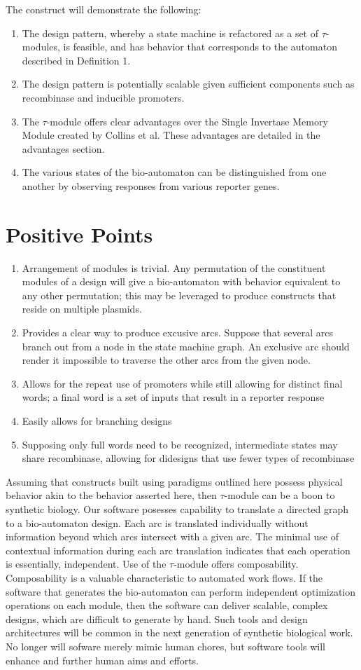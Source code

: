 \documentclass{article}
\begin{document}
\newpage%
The construct will demonstrate the following:
\begin{enumerate}
\item The design pattern, whereby a state machine is refactored as a set of $\tau$-modules, is feasible, and has behavior that corresponds to the automaton described in Definition 1.
\item The design pattern is potentially scalable given sufficient components such as recombinase and inducible promoters.
\item The $\tau$-module offers clear advantages over the Single Invertase Memory Module created by Collins et al.  These advantages are detailed in the advantages section.
\item The various states of the bio-automaton can be distinguished from one another by observing responses from various reporter genes.
\end{enumerate}
\section{Positive Points}
\begin{enumerate}
\item Arrangement of modules is trivial.  Any permutation of the constituent modules of a design will give a bio-automaton with behavior equivalent to any other permutation; this may be leveraged to produce constructs that reside on multiple plasmids.
\item Provides a clear way to produce excusive arcs.  Suppose that several arcs branch out from a node in the state machine graph.  An exclusive arc should render it impossible to traverse the other arcs from the given node. 
\item Allows for the repeat use of promoters while still allowing for distinct final words; a final word is a set of inputs that result in a reporter response
\item Easily allows for branching designs
\item Supposing only full words need to be recognized, intermediate states may share recombinase, allowing for didesigns that use fewer types of recombinase 
\end{enumerate}

Assuming that constructs built using paradigms outlined here possess physical behavior akin to the behavior asserted here, then $\tau$-module can be a boon to synthetic biology. Our software posesses capability to translate a directed graph to a bio-automaton design.  Each arc is translated individually without information beyond which arcs intersect with a given arc. The minimal use of contextual information during each arc translation indicates that each operation is essentially, independent.  Use of the $\tau$-module offers composability. Composability is a valuable characteristic to automated work flows. If the software that generates the bio-automaton can perform independent optimization operations on each module, then the software can deliver scalable, complex designs, which are difficult to generate by hand. Such tools and design architectures will be common in the next generation of synthetic biological work.  No longer will sofware merely mimic human chores, but software tools will enhance and further human aims and efforts.   
\end{document}
